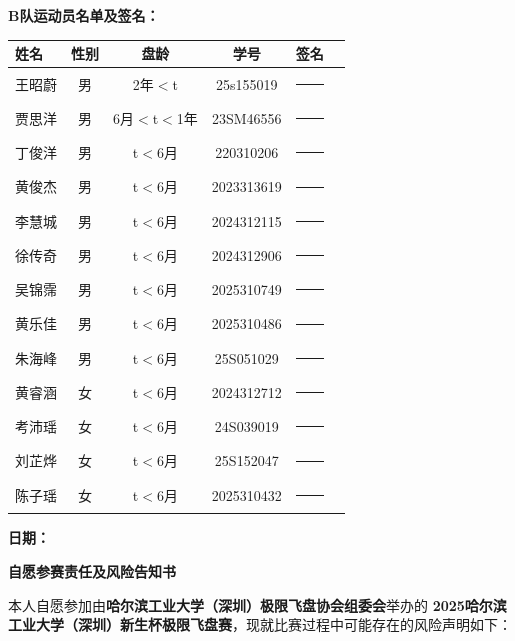 \documentclass{article}
\begin{document}
\noindent \textbf{B队运动员名单及签名：} \\
\begin{center}
\small %
\renewcommand{\arraystretch}{1.8} %
\begin{tabular}{lccccl}
    \toprule
    \textbf{姓名} & \textbf{性别} & \textbf{盘龄} & \textbf{学号} & \textbf{签名} \\[3pt] %
    \midrule
    王昭蔚 & 男 & 2年$<$t & 25s155019 & \rule{3cm}{0.4pt} \\
    贾思洋 & 男 & 6月$<$t$<$1年 & 23SM46556 & \rule{3cm}{0.4pt} \\
    丁俊洋 & 男 & t$<$6月 & 220310206 & \rule{3cm}{0.4pt} \\
    黄俊杰 & 男 & t$<$6月 & 2023313619 & \rule{3cm}{0.4pt} \\
    李慧城 & 男 & t$<$6月 & 2024312115 & \rule{3cm}{0.4pt} \\
    徐传奇 & 男 & t$<$6月 & 2024312906 & \rule{3cm}{0.4pt} \\
    吴锦霈 & 男 & t$<$6月 & 2025310749 & \rule{3cm}{0.4pt} \\
    黄乐佳 & 男 & t$<$6月 & 2025310486 & \rule{3cm}{0.4pt} \\
    朱海峰 & 男 & t$<$6月 & 25S051029 & \rule{3cm}{0.4pt} \\
    黄睿涵 & 女 & t$<$6月 & 2024312712 & \rule{3cm}{0.4pt} \\
    考沛瑶 & 女 & t$<$6月 & 24S039019 & \rule{3cm}{0.4pt} \\
    刘芷烨 & 女 & t$<$6月 & 25S152047 & \rule{3cm}{0.4pt} \\
    陈子瑶 & 女 & t$<$6月 & 2025310432 & \rule{3cm}{0.4pt} \\
    \bottomrule
\end{tabular}
\end{center}

\vspace{0.5cm} %
\noindent \textbf{日期：}
\newpage

\begin{center}
    \vspace*{-1.5cm} %
    {\fontsize{18pt}{28pt}\selectfont\textbf{自愿参赛责任及风险告知书}} %
    \vspace{0.5cm} %
\end{center}

本人自愿参加由\textbf{哈尔滨工业大学（深圳）极限飞盘协会组委会}举办的 \textbf{2025哈尔滨工业大学（深圳）新生杯极限飞盘赛}，现就比赛过程中可能存在的风险声明如下：
\end{document}
